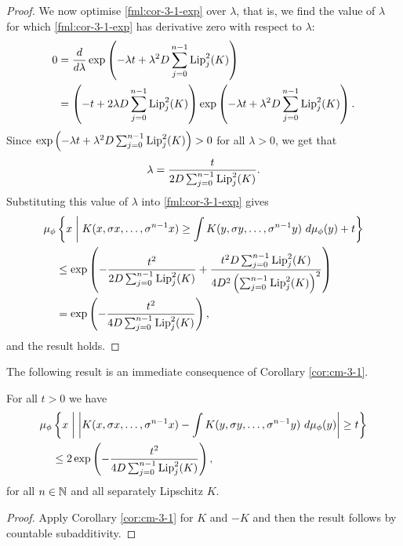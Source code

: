 \begin{corollary}
\begin{proof}
		We now optimise \eqref{fml:cor-3-1-exp} over $\lambda$, that is, we find the value of $\lambda$ for which \eqref{fml:cor-3-1-exp} has derivative zero with respect to $\lambda$:
		\begin{align*}
			0 &= \frac{d}{d\lambda} \exp\left(-\lambda t + \lambda^2 D \sum_{j = 0}^{n - 1}{\operatorname{Lip}_j^2(K)}\right) \\
				&= \left(-t + 2\lambda D \sum_{j = 0}^{n - 1}{\operatorname{Lip}_j^2(K)}\right) \exp\left(-\lambda t + \lambda^2 D \sum_{j = 0}^{n - 1}{\operatorname{Lip}_j^2(K)}\right).
		\end{align*}
		Since $\exp\left(-\lambda t + \lambda^2 D \sum_{j = 0}^{n - 1}{\operatorname{Lip}_j^2(K)}\right) > 0$ for all $\lambda > 0$, we get that
		\[
			\lambda = \frac{t}{2D \sum_{j = 0}^{n - 1}{\operatorname{Lip}_j^2(K)}}.
		\]
		Substituting this value of $\lambda$ into \eqref{fml:cor-3-1-exp} gives
		\begin{align*}
			\mu_\phi&\left\{x \midmid K(x, \sigma{x}, \dots, \sigma^{n - 1}{x}) \geq \int{K(y, \sigma{y}, \dots, \sigma^{n - 1}{y})\ d\mu_\phi(y)} + t\right\} \\
			 &\leq \exp\left(-\frac{t^2}{2D \sum_{j = 0}^{n - 1}{\Lip_j^2(K)}} + \frac{t^2 D \sum_{j = 0}^{n - 1}{\Lip_j^2(K)}}{4D^2 \left(\sum_{j = 0}^{n - 1}{\Lip_j^2(K)}\right)^2}\right) \\
			 &= \exp\left(-\frac{t^2}{4D\sum_{j = 0}^{n - 1}{\Lip_j^2(K)}}\right),
		\end{align*}
		and the result holds.
	\end{proof}
\end{corollary}

The following result is an immediate consequence of Corollary \ref{cor:cm-3-1}.

\begin{corollary}\label{cor:cm-3-1-5}
	For all $t > 0$ we have
	\begin{align}\label{fml:cm-4}
		\mu_\phi&\left\{x \midmid \left| K(x, \sigma{x}, \dots, \sigma^{n - 1}{x}) - \int{K(y, \sigma{y}, \dots, \sigma^{n - 1}{y})\ d\mu_\phi(y)} \right| \geq t\right\} \nonumber \\
		&\leq 2\exp\left(-\frac{t^2}{4D\sum_{j = 0}^{n - 1}{\Lip_j^2(K)}}\right),
	\end{align}
	for all $n \in \mathbb{N}$ and all separately Lipschitz $K$.
	\begin{proof}
		Apply Corollary \ref{cor:cm-3-1} for $K$ and $-K$ and then the result follows by countable subadditivity.
	\end{proof}
\end{corollary}

